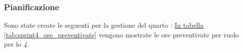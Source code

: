 \subsubsection{Pianificazione}
Sono state create le seguenti  per la gestione del quarto : 
\hyperref[tab:sprint4_ore_preventivate]{In tabella \ref{tab:sprint4_ore_preventivate}} vengono mostrate le ore preventivate per ruolo per lo \textit{ 4}.

\begin{table}[H]
    \centering
    \caption{Ore preventivate per ruolo  4}
    \label{tab:sprint4_ore_preventivate}
\end{table}